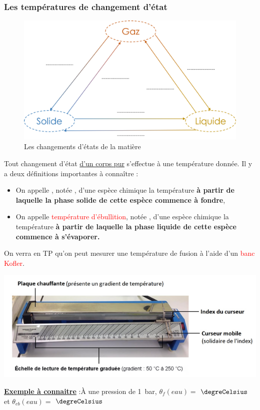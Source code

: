 \subsubsection{Les températures de changement d'état}
\begin{figure}[!htb]
    \centering
    \includegraphics[scale=0.5]{Images/Chapitre_1/Changement_etat.png}
    \caption{Les changements d'états de la matière}
    \label{fig:enter-label}
\end{figure}
Tout changement d'état \underline{d'un corps pur} s'effectue à une température donnée. Il y a deux définitions importantes à connaître :
\begin{itemize}
    \item On appelle , notée , d'une espèce chimique la température \textbf{à partir de laquelle la phase solide de cette espèce commence à fondre},
    \item On appelle \textcolor{red}{température d'ébullition}, notée , d'une espèce chimique la température \textbf{à partir de laquelle la phase liquide de cette espèce commence à s'évaporer.} 
\end{itemize}
On verra en TP qu'on peut mesurer une température de fusion à l'aide d'un \textcolor{red}{banc Kofler}.

\begin{minipage}{0.6\textwidth}
\includegraphics[width=1\textwidth]{Images/Chapitre_1/Banc_Kofler.png} 
  \end{minipage}
\begin{minipage}{0.4\textwidth}
\underline{\textbf{Exemple à connaitre}} :\newline \`{A} une pression de 1~bar, $\theta_{f}(eau)=$ $\degreCelsius$ et $\theta_{eb}(eau)=$ $\degreCelsius$
  \end{minipage}



